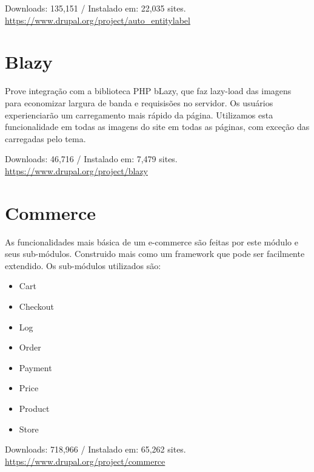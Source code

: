 \begin{center}
  Downloads: 135,151 / Instalado em: 22,035 sites. \\
  \url{https://www.drupal.org/project/auto_entitylabel}
\end{center}

\section{Blazy}
Prove integração com a biblioteca PHP bLazy, que faz lazy-load das imagens para economizar largura de banda e requisisões no servidor. Os usuários experienciarão um carregamento mais rápido da página. Utilizamos esta funcionalidade em todas as imagens do site em todas as páginas, com exceção das carregadas pelo tema.

\begin{center}
  Downloads: 46,716 / Instalado em: 7,479 sites. \\
  \url{https://www.drupal.org/project/blazy}
\end{center}

\section{Commerce}
As funcionalidades mais básica de um e-commerce são feitas por este módulo e seus sub-módulos. Construido mais como um framework que pode ser facilmente extendido. Os sub-módulos utilizados são:

\begin{itemize}
  \item Cart
  \item Checkout
  \item Log
  \item Order
  \item Payment
  \item Price
  \item Product
  \item Store
\end{itemize}

\begin{center}
  Downloads: 718,966 / Instalado em: 65,262 sites. \\
  \url{https://www.drupal.org/project/commerce}
\end{center}

